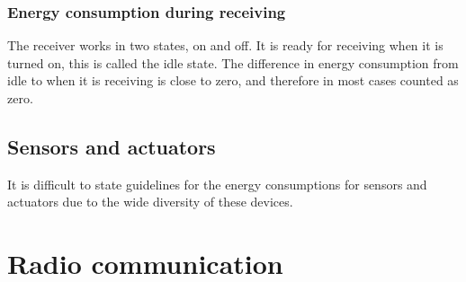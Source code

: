 \subsubsection*{Energy consumption during receiving}
The receiver works in two states, on and off. It is ready for receiving when it is turned on, this is called the idle state. The difference in energy consumption from idle to when it is receiving is close to zero, and therefore in most cases counted as zero.


\subsection{Sensors and actuators}
It is difficult to state guidelines for the energy consumptions for sensors and actuators due to the wide diversity of these devices.
  
 
\section{Radio communication}